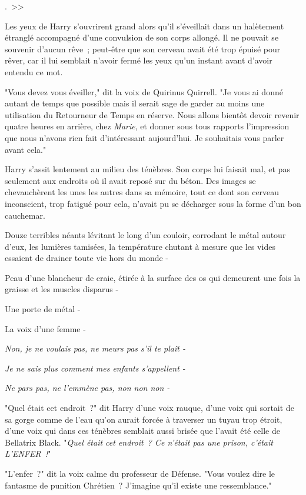 
.~>>

\hplettrineextrapara
Les yeux de Harry s'ouvrirent grand alors qu'il s'éveillait dans un halètement étranglé accompagné d'une convulsion de son corps allongé. Il ne pouvait se souvenir d'aucun rêve~; peut-être que son cerveau avait été trop épuisé pour rêver, car il lui semblait n'avoir fermé les yeux qu'un instant avant d'avoir entendu ce mot.

"Vous devez vous éveiller," dit la voix de Quirinus Quirrell. "Je vous ai donné autant de temps que possible mais il serait sage de garder au moins une utilisation du Retourneur de Temps en réserve. Nous allons bientôt devoir revenir quatre heures en arrière, chez \emph{Marie}, et donner sous tous rapports l'impression que nous n'avons rien fait d'intéressant aujourd'hui. Je souhaitais vous parler avant cela."

Harry s'assit lentement au milieu des ténèbres. Son corps lui faisait mal, et pas seulement aux endroits où il avait reposé sur du béton. Des images se chevauchèrent les unes les autres dans sa mémoire, tout ce dont son cerveau inconscient, trop fatigué pour cela, n'avait pu se décharger sous la forme d'un bon cauchemar.

Douze terribles néants lévitant le long d'un couloir, corrodant le métal autour d'eux, les lumières tamisées, la température chutant à mesure que les vides essaient de drainer toute vie hors du monde -

Peau d'une blancheur de craie, étirée à la surface des os qui demeurent une fois la graisse et les muscles disparus -

Une porte de métal -

La voix d'une femme -

\emph{Non, je ne voulais pas, ne meurs pas s'il te plaît -}

\emph{Je ne sais plus comment mes enfants s'appellent -}

\emph{Ne pars pas, ne l'emmène pas, non non non -}

"Quel était cet endroit~?" dit Harry d'une voix rauque, d'une voix qui sortait de sa gorge comme de l'eau qu'on aurait forcée à traverser un tuyau trop étroit, d'une voix qui dans ces ténèbres semblait aussi brisée que l'avait été celle de Bellatrix Black. "\emph{Quel était cet endroit~? Ce n'était pas une prison, c'était L'ENFER~!}"

"L'enfer~?" dit la voix calme du professeur de Défense. "Vous voulez dire le fantasme de punition Chrétien~? J'imagine qu'il existe une ressemblance."

